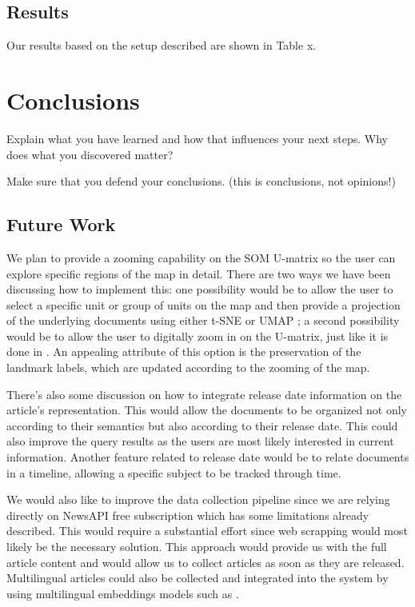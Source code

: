 \documentclass[a4paper]{article}
\begin{document}
\subsection{Results}
Our results based on the setup described are shown in Table x.

\section{Conclusions}
Explain what you have learned and how that influences your next steps. Why does what you discovered matter?

Make sure that you defend your conclusions. (this is conclusions, not opinions!)

\subsection{Future Work}

We plan to provide a zooming capability on the SOM U-matrix so the user can explore specific regions of the map in detail. There are two ways we have been discussing how to implement this: one possibility would be to allow the user to select a specific unit or group of units on the map and then provide a projection of the underlying documents using either t-SNE \citep{vandermaaten2008} or UMAP \citep{mcinnes2020}; a second possibility would be to allow the user to digitally zoom in on the U-matrix, just like it is done in \citet{kaski1998}. An appealing attribute of this option is the preservation of the landmark labels, which are updated according to the zooming of the map.

There's also some discussion on how to integrate release date information on the article's representation. This would allow the documents to be organized not only according to their semantics but also according to their release date. This could also improve the query results as the users are most likely interested in current information. Another feature related to release date would be to relate documents in a timeline, allowing a specific subject to be tracked through time. 

We would also like to improve the data collection pipeline since we are relying directly on NewsAPI free subscription which has some limitations already described. This would require a substantial effort since web scrapping would most likely be the necessary solution. This approach would provide us with the full article content and would allow us to collect articles as soon as they are released. Multilingual articles could also be collected and integrated into the system by using multilingual embeddings models such as \citet{conneau2019}.
\end{document}
